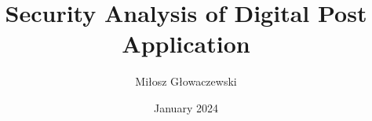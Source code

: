 \documentclass{article}
\title{Security Analysis of Digital Post Application}
\author{Miłosz Głowaczewski}
\date{January 2024}
\begin{document}
    \maketitle
    \pagebreak
    \tableofcontents

    
    
    
    
    
    
    
    

    
    
%
%
%
%
\end{document}
